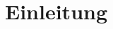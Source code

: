 \documentclass[a4paper,11pt,bibliography=totoc,listof=totoc,headinclude=true,cleardoublepage=empty,oneside]{scrbook}
\begin{document}

\tableofcontents

\cleardoublepage
{} 


\chapter{Einleitung}
\label{chapter:introduction}
\end{document}
